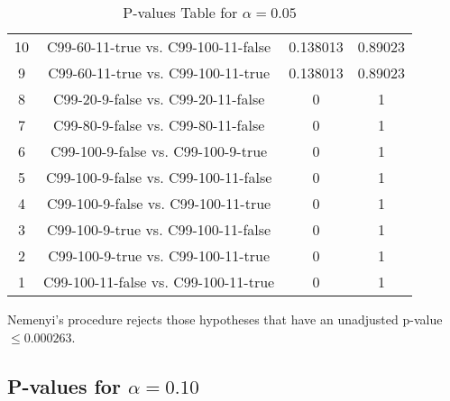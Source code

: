 \documentclass[a4paper,10pt]{article}
\begin{document}
\begin{landscape}
\begin{table}[!htp]
\begin{tabular}{cccc}
10&C99-60-11-true vs. C99-100-11-false&0.138013&0.89023\\
9&C99-60-11-true vs. C99-100-11-true&0.138013&0.89023\\
8&C99-20-9-false vs. C99-20-11-false&0&1\\
7&C99-80-9-false vs. C99-80-11-false&0&1\\
6&C99-100-9-false vs. C99-100-9-true&0&1\\
5&C99-100-9-false vs. C99-100-11-false&0&1\\
4&C99-100-9-false vs. C99-100-11-true&0&1\\
3&C99-100-9-true vs. C99-100-11-false&0&1\\
2&C99-100-9-true vs. C99-100-11-true&0&1\\
1&C99-100-11-false vs. C99-100-11-true&0&1\\
\hline
\end{tabular}
\caption{P-values Table for $\alpha=0.05$}
\end{table}Nemenyi's procedure rejects those hypotheses that have an unadjusted p-value $\le0.000263$.

\pagebreak

\subsection{P-values for $\alpha=0.10$}


\end{landscape}
\end{document}
